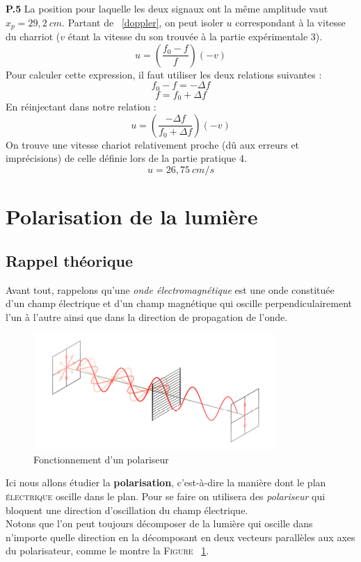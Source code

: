 \documentclass	[11pt, a4paper, openany]{book}
\begin{document}
\textbf{P.5}
La position pour laquelle les deux signaux ont la même amplitude vaut $x_p = 29,2\ cm$. Partant de ~\eqref{doppler}, on peut isoler $u$ correspondant à la vitesse du charriot ($v$ étant la vitesse du son trouvée à la partie expérimentale 3).
\begin{equation}
u = \left(\frac{f_0 - f}{f}\right)\left(-v\right)
\end{equation}
Pour calculer cette expression, il faut utiliser les deux relations suivantes :
\begin{equation}
f_0 - f = -\Delta f
\end{equation}
\begin{equation}
f = f_0 + \Delta f
\end{equation}
En réinjectant dans notre relation : 
\begin{equation}
u = \left(\frac{-\Delta f}{f_0 + \Delta f}\right)\left(-v\right)
\end{equation}
On trouve une vitesse chariot relativement proche (dû aux erreurs et imprécisions) de celle définie lors de la partie pratique 4.
\begin{equation}
u = 26,75\ cm/s
\end{equation}


\newpage
\section{Polarisation de la lumière}
\subsection{Rappel théorique}
Avant tout, rappelons qu'une \textit{onde électromagnétique} est une onde constituée d'un champ électrique et d'un champ magnétique qui oscille perpendiculairement l'un à l'autre ainsi que dans la direction de propagation de l'onde.\\
\begin{figure}[h]
\begin{center}
\includegraphics[scale=0.5]{labo/image3.png}
\end{center}
\caption{Fonctionnement d'un polariseur}
\label{image1}
\end{figure}
Ici nous allons étudier la \textbf{polarisation}, c'est-à-dire la manière dont le plan \textsc{électrique} oscille dans le plan. Pour se faire on utilisera des \textit{polariseur} qui bloquent une direction d'oscillation du champ électrique.\\
Notons que l'on peut toujours décomposer de la lumière qui oscille dans n'importe quelle direction en la décomposant en deux vecteurs parallèles aux axes du polarisateur, comme le montre la \textsc{Figure} ~\ref{image1}.\\
\end{document}
